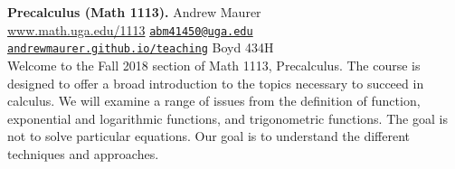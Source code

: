 \documentclass[letterpaper,11pt]{article}
\begin{document}
\noindent\textbf{Precalculus (Math 1113).} \hfill Andrew Maurer
\\
\url{www.math.uga.edu/1113} \hfill \href{mailto:abm41450@uga.edu}{\texttt{abm41450@uga.edu}}
\\
\href{http://andrewmaurer.github.io/teaching}{\texttt{andrewmaurer.github.io/teaching}} \hfill Boyd 434H
\\

\noindent Welcome to the Fall 2018 section of Math 1113,
Precalculus. The course is designed to offer a broad introduction
to the topics necessary to succeed in calculus. We will examine a
range of issues from the definition of function, exponential and
logarithmic functions, and trigonometric functions. The goal is not to
solve particular equations. Our goal is to understand the different
techniques and approaches.


\end{document}

